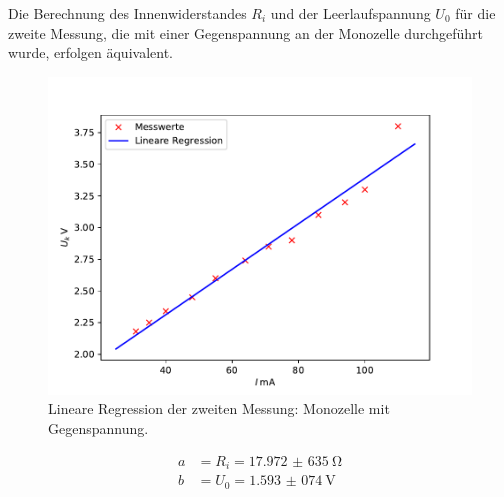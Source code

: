 \noindent Die Berechnung des Innenwiderstandes $R_{i}$ und der Leerlaufspannung $U_{0}$ für
die zweite Messung, die mit einer Gegenspannung an der Monozelle durchgeführt wurde,
erfolgen äquivalent.

\begin{figure}[H]
  \centering
  \includegraphics{plot2.pdf}
  \caption{Lineare Regression der zweiten Messung: Monozelle mit Gegenspannung.}
  \label{fig:plot2}
\end{figure}

\begin{align*}
  a &= R_{i} = \SI{17,972(635)}{\ohm} \\
  b &= U_{0} = \SI{1,593(074)}{\volt}
\end{align*}

